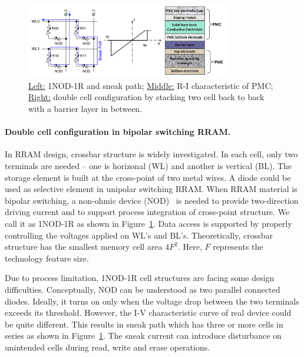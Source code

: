 \begin{figure}
\centering
\vspace{-10pt}
\includegraphics[width=0.8\textwidth]{./figure/6_doublecell.pdf}
\vspace{-10pt}
\caption{\underline{Left:} 1NOD-1R and sneak path; \underline{Middle:} R-I characteristic of PMC; \underline{Right:} double cell configuration by stacking two cell back to back with a barrier layer in between.}
\label{doublecell}
\vspace{-10pt}
\end{figure}

\paragraph{Double cell configuration in bipolar switching RRAM.}
In RRAM design, crossbar structure is widely investigated. In each cell, only two terminals are needed -- one is horizonal (WL) and another is vertical (BL). The storage element is built at the cross-point of two metal wires. A diode could be used as selective element in unipolar switching RRAM. When RRAM material is bipolar switching, a non-ohmic device (NOD)~\cite{Yan4430255} is needed to provide two-direction driving current and to support process integration of cross-point structure. We call it as 1NOD-1R as shown in Figure~\ref{doublecell}. Data access is supported by properly controlling the voltages applied on WL's and BL's. Theoretically, crossbar structure has the smallest memory cell area 4$F^2$. Here, $F$ represents the technology feature size.

Due to process limitation, 1NOD-1R cell structures are facing some design difficulties. Conceptually, NOD can be understood as two parallel connected diodes. Ideally, it turns on only when the voltage drop between the two terminals exceeds its threshold. However, the I-V characteristic curve of real device could be quite different. This results in sneak path which has three or more cells in series as shown in Figure~\ref{doublecell}. The sneak current can introduce disturbance on unintended cells during read, write and erase operations.


